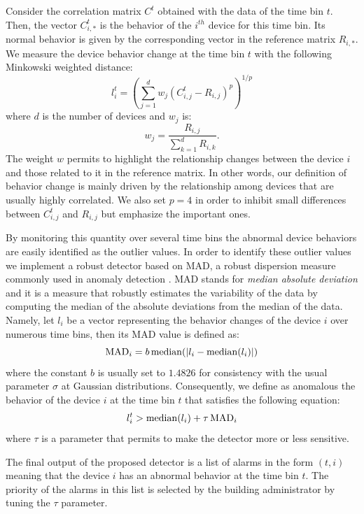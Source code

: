Consider the correlation matrix $C^t$ obtained with the data of the time bin $t$.
Then, the vector $C^t_{i,*}$ is the behavior of the $i^{th}$ device for this time bin.
Its normal behavior is given by the corresponding vector in the reference matrix $R_{i,*}$.
We measure the device behavior change at the time bin $t$ with the following Minkowski weighted distance:
\[ l^t_{i} = \left(\sum_{j=1}^d  w_j\left(C^t_{i,j} - R_{i,j}\right)^p\right)^{1/p} \]
where $d$ is the number of devices and $w_j$ is:
\[ w_j = \frac{R_{i,j}}{\sum_{k=1}^d R_{i,k}}. \]
The weight $w$ permits to highlight the relationship changes between the device $i$ and those related to it in the reference matrix.
In other words, our definition of behavior change is mainly driven by the relationship among devices that are usually highly correlated.
We also set $p=4$ in order to inhibit small differences between $C^t_{i,j}$ and $R_{i,j}$ but emphasize the important ones.

By monitoring this quantity over several time bins the abnormal device behaviors are easily identified as the outlier values.
In order to identify these outlier values we implement a robust detector based on MAD, a robust dispersion measure commonly used in anomaly detection \cite{huber:wiley2009,chan:springer2005}.
MAD stands for \emph{median absolute deviation} and it is a measure that robustly estimates the variability of the data by computing the median of the absolute deviations from the median of the data.
Namely, let $l_{i}$ be a vector representing the behavior changes of the device $i$ over numerous time bins, then its MAD value is defined as:
\[ \operatorname{MAD}_i = b \operatorname{median}(\lvert l_{i} - \operatorname{median}(l_{i})\rvert)\]
where the constant $b$ is usually set to $1.4826$ for consistency with the usual parameter $\sigma$ at Gaussian distributions.
Consequently, we define as anomalous the behavior of the device $i$ at the time bin $t$ that satisfies the following equation:
\[l^t_{i} > \operatorname{median}(l_{i}) + \tau  \operatorname{MAD}_i\]
where $\tau$ is a parameter that permits to make the detector more or less sensitive.

The final output of the proposed detector is a list of alarms in the form $(t,i)$ meaning that the device $i$ has an abnormal behavior at the time bin $t$.
The priority of the alarms in this list is selected by the building administrator by tuning the $\tau$ parameter.
